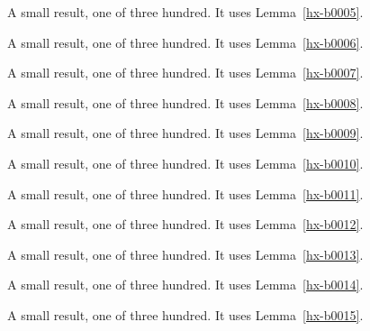 \begin{lemma}[Bulk 6]\label{hx-b0006}
A small result, one of three hundred. It uses Lemma~\ref{hx-b0005}.
\end{lemma}

\begin{lemma}[Bulk 7]\label{hx-b0007}
A small result, one of three hundred. It uses Lemma~\ref{hx-b0006}.
\end{lemma}

\begin{lemma}[Bulk 8]\label{hx-b0008}
A small result, one of three hundred. It uses Lemma~\ref{hx-b0007}.
\end{lemma}

\begin{lemma}[Bulk 9]\label{hx-b0009}
A small result, one of three hundred. It uses Lemma~\ref{hx-b0008}.
\end{lemma}

\begin{lemma}[Bulk 10]\label{hx-b0010}
A small result, one of three hundred. It uses Lemma~\ref{hx-b0009}.
\end{lemma}

\begin{lemma}[Bulk 11]\label{hx-b0011}
A small result, one of three hundred. It uses Lemma~\ref{hx-b0010}.
\end{lemma}

\begin{lemma}[Bulk 12]\label{hx-b0012}
A small result, one of three hundred. It uses Lemma~\ref{hx-b0011}.
\end{lemma}

\begin{lemma}[Bulk 13]\label{hx-b0013}
A small result, one of three hundred. It uses Lemma~\ref{hx-b0012}.
\end{lemma}

\begin{lemma}[Bulk 14]\label{hx-b0014}
A small result, one of three hundred. It uses Lemma~\ref{hx-b0013}.
\end{lemma}

\begin{lemma}[Bulk 15]\label{hx-b0015}
A small result, one of three hundred. It uses Lemma~\ref{hx-b0014}.
\end{lemma}

\begin{lemma}[Bulk 16]\label{hx-b0016}
A small result, one of three hundred. It uses Lemma~\ref{hx-b0015}.
\end{lemma}

